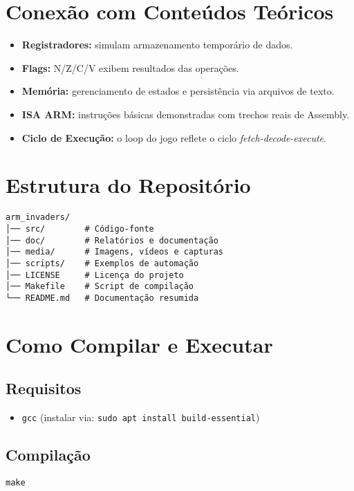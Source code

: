 \documentclass[12pt,a4paper]{report}
\begin{document}
\chapter{Conexão com Conteúdos Teóricos}
\begin{itemize}
    \item \textbf{Registradores:} simulam armazenamento temporário de dados.
    \item \textbf{Flags:} N/Z/C/V exibem resultados das operações.
    \item \textbf{Memória:} gerenciamento de estados e persistência via arquivos de texto.
    \item \textbf{ISA ARM:} instruções básicas demonstradas com trechos reais de Assembly.
    \item \textbf{Ciclo de Execução:} o loop do jogo reflete o ciclo \textit{fetch-decode-execute}.
\end{itemize}

\chapter{Estrutura do Repositório}
\begin{verbatim}
arm_invaders/
│── src/        # Código-fonte
│── doc/        # Relatórios e documentação
│── media/      # Imagens, vídeos e capturas
│── scripts/    # Exemplos de automação
│── LICENSE     # Licença do projeto
│── Makefile    # Script de compilação
└── README.md   # Documentação resumida
\end{verbatim}

\chapter{Como Compilar e Executar}
\section*{Requisitos}
\begin{itemize}
    \item \texttt{gcc} (instalar via: \texttt{sudo apt install build-essential})
\end{itemize}

\section*{Compilação}
\begin{verbatim}
make
\end{verbatim}
\end{document}
